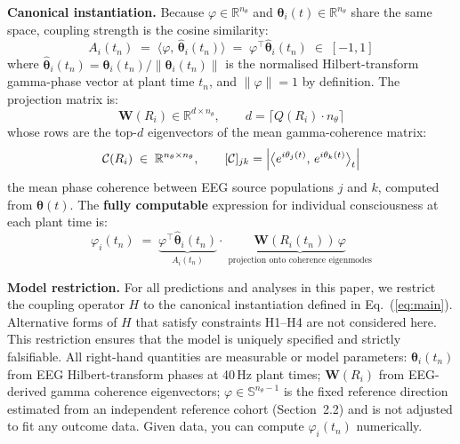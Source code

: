 \documentclass[12pt]{article}
\begin{document}
\textbf{Canonical instantiation.} Because $\varphi \in \mathbb{R}^{n_\theta}$ and $\boldsymbol{\theta}_i(t) \in \mathbb{R}^{n_\theta}$ share the same space, coupling strength is the cosine similarity:
\begin{equation}\label{eq:coupling}
    A_i(t_n) \;=\; \langle \varphi,\, \hat{\boldsymbol{\theta}}_i(t_n) \rangle
    \;=\; \varphi^\top \hat{\boldsymbol{\theta}}_i(t_n)
    \;\in\; [-1, 1]
\end{equation}
where $\hat{\boldsymbol{\theta}}_i(t_n) = \boldsymbol{\theta}_i(t_n) /
\|\boldsymbol{\theta}_i(t_n)\|$ is the normalised Hilbert-transform gamma-phase vector at plant time $t_n$, and $\|\varphi\| = 1$ by definition. The projection matrix is:
\begin{equation}
    \mathbf{W}(R_i) \in \mathbb{R}^{d\times n_\theta}, \qquad
    d = \lceil Q(R_i)\cdot n_\theta \rceil
\end{equation}
whose rows are the top-$d$ eigenvectors of the mean gamma-coherence matrix:
\begin{equation}
    \mathcal{C}(R_i) \;\in\; \mathbb{R}^{n_\theta\times n_\theta}, \qquad
    [\mathcal{C}]_{jk} = \Bigl|\bigl\langle e^{i\theta_j(t)},\, e^{i\theta_k(t)}
    \bigr\rangle_t\Bigr|
\end{equation}
the mean phase coherence between EEG source populations $j$ and $k$, computed from $\boldsymbol{\theta}(t)$. The \textbf{fully computable} expression for individual consciousness at each plant time is:
\begin{equation}\label{eq:main}
\boxed{
    \varphi_i(t_n) \;=\;
    \underbrace{\varphi^\top \hat{\boldsymbol{\theta}}_i(t_n)}_{A_i(t_n)}
    \cdot\;
    \underbrace{\mathbf{W}(R_i(t_n))\,\varphi}_{\text{projection onto coherence eigenmodes}}
}
\end{equation}

\textbf{Model restriction.}
For all predictions and analyses in this paper, we restrict the coupling operator $H$ to the canonical instantiation defined in Eq.~(\ref{eq:main}). Alternative forms of $H$ that satisfy constraints H1--H4 are not considered here. This restriction ensures that the model is uniquely specified and strictly falsifiable. All right-hand quantities are measurable or model parameters: $\boldsymbol{\theta}_i(t_n)$ from EEG Hilbert-transform phases at 40\,Hz plant times; $\mathbf{W}(R_i)$ from EEG-derived gamma coherence eigenvectors; $\varphi \in \mathbb{S}^{n_\theta-1}$ is the fixed reference direction estimated from an independent reference cohort (Section~2.2) and is not adjusted to fit any outcome data. Given data, you can compute $\varphi_i(t_n)$ numerically.
\end{document}
